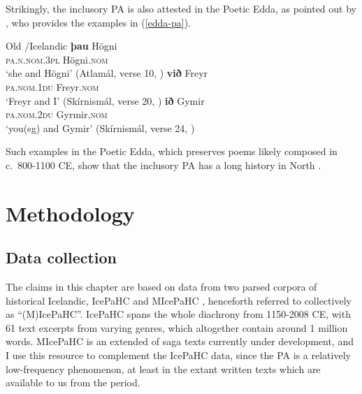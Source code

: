 \documentclass[output=paper,colorlinks,citecolor=brown]{langscibook}
\begin{document}
Strikingly, the inclusory PA is also attested in the Poetic Edda, as pointed out by \citet[220]{bergmann1838poemes}, who provides the examples in (\ref{edda-pa}).

\ea \label{edda-pa} Old /Icelandic
\ea \gll \textbf{þau} Högni\\
\textsc{pa.n.nom.3pl} Högni.\textsc{nom}\\
\glt `she and Högni' (Atlamál, verse 10, \citealp[220]{bergmann1838poemes})
\ex  \gll \textbf{við} Freyr\\
\textsc{pa.nom.1du} Freyr.\textsc{nom}\\
\glt `Freyr and I' (Skírnismál, verse 20, \citealp[220]{bergmann1838poemes})
\ex \gll \textbf{ið} Gymir\\
\textsc{pa.nom.2du} Gyrmir.\textsc{nom}\\
\glt `you(sg) and Gymir' (Skírnismál, verse 24, \citealp[220]{bergmann1838poemes})
\z 
\z

Such examples in the Poetic Edda, which preserves poems likely composed in c.~800-1100 CE, show that the inclusory PA has a long history in North .

\section{Methodology}\label{sect:method}

\subsection{Data collection}

The claims in this chapter are based on data from two parsed corpora of historical Icelandic, IcePaHC \citep{IcePaHC} and MIcePaHC \citep{MIcePaHC}, henceforth referred to collectively as ``(M)IcePaHC''. IcePaHC spans the whole  diachrony from 1150-2008 CE, with 61 text excerpts from varying genres, which altogether contain around 1 million words. MIcePaHC is an extended  of  saga texts currently under development, and I use this resource to complement the IcePaHC data, since the PA is a relatively low-frequency phenomenon, at least in the extant written texts which are available to us from the  period. 
\end{document}
